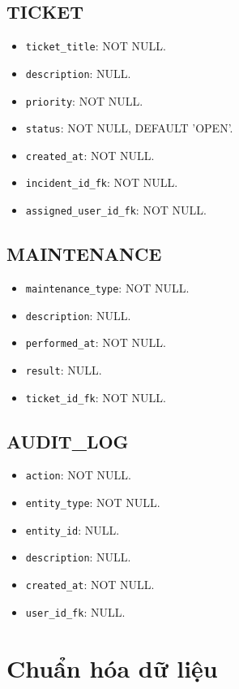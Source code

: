 \subsection{TICKET}
\begin{itemize}
    \item \texttt{ticket\_title}: NOT NULL.
    \item \texttt{description}: NULL.
    \item \texttt{priority}: NOT NULL.
    \item \texttt{status}: NOT NULL, DEFAULT 'OPEN'.
    \item \texttt{created\_at}: NOT NULL.
    \item \texttt{incident\_id\_fk}: NOT NULL.
    \item \texttt{assigned\_user\_id\_fk}: NOT NULL.
\end{itemize}

\subsection{MAINTENANCE}
\begin{itemize}
    \item \texttt{maintenance\_type}: NOT NULL.
    \item \texttt{description}: NULL.
    \item \texttt{performed\_at}: NOT NULL.
    \item \texttt{result}: NULL.
    \item \texttt{ticket\_id\_fk}: NOT NULL.
\end{itemize}

\subsection{AUDIT\_LOG}
\begin{itemize}
    \item \texttt{action}: NOT NULL.
    \item \texttt{entity\_type}: NOT NULL.
    \item \texttt{entity\_id}: NULL.
    \item \texttt{description}: NULL.
    \item \texttt{created\_at}: NOT NULL.
    \item \texttt{user\_id\_fk}: NULL.
\end{itemize}

\section{Chuẩn hóa dữ liệu}

